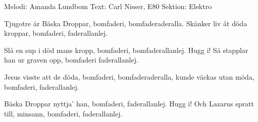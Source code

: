 \begin{song}

\begin{songmeta}
Melodi: Amanda Lundbom
Text: Carl Nisser, E80
Sektion: Elektro
\end{songmeta}

\begin{songtext}
Tjugotre är Bäska Droppar,
bomfaderi, bomfaderaderalla.
Skänker liv åt döda kroppar,
bomfaderi, faderallanlej.

Slå en sup i död mans kropp,
bomfaderi, bomfaderallanlej. Hugg i!
Så stapplar han ur graven opp,
bomfaderi faderallanlej.

Jesus visste att de döda,
bomfaderi, bomfaderaderalla,
kunde väckas utan möda,
bomfaderi, faderallanlej.

Bäska Droppar nyttja' han,
bomfaderi, faderallanlej. Hugg i!
Och Lazarus spratt till, minsann,
bomfaderi, faderallanlej.
\end{songtext}
\end{song}
